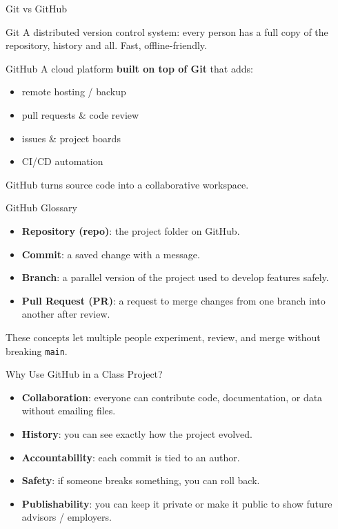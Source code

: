 \documentclass{beamer}
\begin{document}
\begin{frame}{Git vs GitHub}
  \begin{block}{Git}
    A distributed version control system: every person has a full copy of the repository, history and all.
    Fast, offline-friendly.
  \end{block}

  \begin{block}{GitHub}
    A cloud platform \textbf{built on top of Git} that adds:
    \begin{itemize}
      \item remote hosting / backup
      \item pull requests \& code review
      \item issues \& project boards
      \item CI/CD automation
    \end{itemize}
    GitHub turns source code into a collaborative workspace.
  \end{block}
\end{frame}

\begin{frame}{GitHub Glossary}
  \begin{itemize}
    \item \textbf{Repository (repo)}: the project folder on GitHub.
    \item \textbf{Commit}: a saved change with a message.
    \item \textbf{Branch}: a parallel version of the project used to develop features safely.
    \item \textbf{Pull Request (PR)}: a request to merge changes from one branch into another after review.
  \end{itemize}

  \vspace{2mm}
  These concepts let multiple people experiment, review, and merge without breaking \texttt{main}.
\end{frame}

\begin{frame}{Why Use GitHub in a Class Project?}
  \begin{itemize}
    \item \textbf{Collaboration}: everyone can contribute code, documentation, or data without emailing files.
    \item \textbf{History}: you can see exactly how the project evolved.
    \item \textbf{Accountability}: each commit is tied to an author.
    \item \textbf{Safety}: if someone breaks something, you can roll back.
    \item \textbf{Publishability}: you can keep it private or make it public to show future advisors / employers.
  \end{itemize}
\end{frame}
\end{document}
